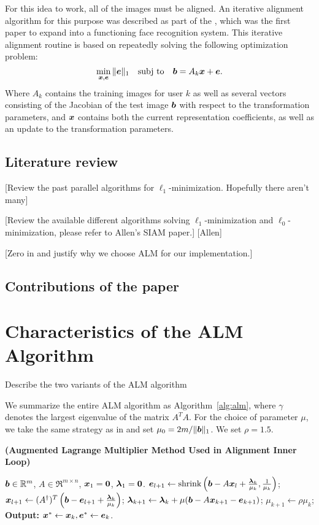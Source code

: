 \documentclass[10pt,twocolumn,letterpaper]{article}
\begin{document}
For this idea to work, all of the images must be aligned. An iterative alignment
algorithm for this purpose was described as part of the \cite{Wagner2009-CVPR}, which was
the first paper to expand \cite{Wright2009-PAMI} into a functioning face recognition system.
This iterative alignment routine is based on repeatedly solving the following optimization problem:
\begin{equation}
\min_{{\boldsymbol{x}}, \boldsymbol{e}} \|\boldsymbol{e}\|_1 \quad \textup{subj to} \quad \boldsymbol{b} = A_k {\boldsymbol{x}} + \boldsymbol{e}.
\end{equation}
Where $A_k$ contains the training images for user $k$ as well as several vectors consisting of the
Jacobian of the test image $\boldsymbol{b}$ with respect to the transformation parameters, and ${\boldsymbol{x}}$ contains
both the current representation coefficients, as well as an update to the transformation parameters.

\subsection{Literature review}
[Review the past parallel algorithms for $\ell_1$-minimization. Hopefully there aren't many]

[Review the available different algorithms solving $\ell_1$-minimization and $\ell_0$-minimization, please refer to Allen's SIAM paper.]
[Allen]

[Zero in and justify why we choose ALM for our implementation.]

\subsection{Contributions of the paper}

\section{Characteristics of the ALM Algorithm}
Describe the two variants of the ALM algorithm

We summarize the entire ALM
algorithm as Algorithm~\ref{alg:alm}, where $\gamma$ denotes the
largest eigenvalue of the matrix $A^TA$. For the choice of parameter $\mu$, we take the same strategy as
in \cite{YangJ2009-pp} and set $\mu_0 = 2m / \|\boldsymbol{b}\|_1$. We set $\rho=1.5$.
\begin{algorithm}[h]
\caption{\bf (Augmented Lagrange Multiplier Method Used in Alignment Inner Loop)}
\begin{algorithmic}[1]
 $\boldsymbol{b} \in \mathbb R^m$, $A \in \Re^{m \times n}$,
${\boldsymbol{x}}_1 = \boldsymbol{0}$, $\boldsymbol{\lambda}_1 = \boldsymbol{0}$.
\STATE $\boldsymbol{e}_{l+1} \leftarrow \textup{shrink}\left(\boldsymbol{b} - A{\boldsymbol{x}}_l + \frac{\boldsymbol{\lambda}_k}{\mu_k}, \frac{1}{\mu_k}\right)$;
\STATE ${\boldsymbol{x}}_{l+1} \leftarrow (A^\dagger)^T \left(\boldsymbol{b} - \boldsymbol{e}_{l+1} + \frac{\boldsymbol{\lambda}_k}{\mu_k} \right) $;
\ENDWHILE
\STATE $\boldsymbol{\lambda}_{k+1} \leftarrow \boldsymbol{\lambda}_k + \mu (\boldsymbol{b} - A{\boldsymbol{x}}_{k+1} - \boldsymbol{e}_{k+1})$;
\STATE $\mu_{k+1} \leftarrow \rho\mu_k$;
\ENDWHILE \STATE
{\bf Output:} ${\boldsymbol{x}}^* \leftarrow {\boldsymbol{x}}_k, \boldsymbol{e}^* \leftarrow \boldsymbol{e}_k$.
\end{algorithmic}
\label{alg:alm}
\end{algorithm}
\end{document}
